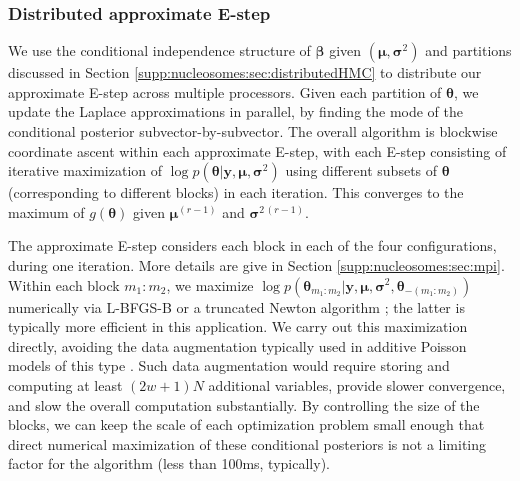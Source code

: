 
\subsubsection{Distributed approximate E-step}
\label{supp:nucleosomes:sec:parallelization}

We use the conditional independence structure of $\bm \beta$ given $(\bm \mu, \bm \sigma^2)$ and partitions discussed in Section \ref{supp:nucleosomes:sec:distributedHMC} to distribute our approximate E-step across multiple processors.
Given each partition of $\bm \theta$, we update the Laplace approximations in parallel, by finding the mode of the conditional posterior subvector-by-subvector.
The overall algorithm is blockwise coordinate ascent within each approximate E-step, with each E-step consisting of iterative maximization of $\log p(\bm \theta | \bm y, \bm \mu, \bm \sigma^2 )$ using different subsets of $\bm \theta$ (corresponding to different blocks) in each iteration.
This converges to the maximum of $g(\bm \theta)$ given $\bm \mu^{(r-1)}$ and $\bm \sigma^{2\,(r-1)}$.

The approximate E-step considers each block in each of the four configurations, during one iteration. 
More details are give in Section \ref{supp:nucleosomes:sec:mpi}.
Within each block $m_1:m_2$, we maximize $\log p(\bm \theta_{m_1:m_2} | \bm y, \bm \mu, \bm \sigma^2, \bm \theta_{-(m_1:m_2)} )$ numerically via L-BFGS-B or a truncated Newton algorithm \citep{lbfgsb1997, Nash2000}; the latter is typically more efficient in this application.
We carry out this maximization directly, avoiding the data augmentation typically used in additive Poisson models of this type \citep[e.g.,][]{VanDykEtAl2006}. 
Such data augmentation would require storing and computing at least $(2w+1)N$ additional variables, provide slower convergence, and slow the overall computation substantially.
By controlling the size of the blocks, we can keep the scale of each optimization problem small enough that direct numerical maximization of these conditional posteriors is not a limiting factor for the algorithm (less than 100ms, typically).


